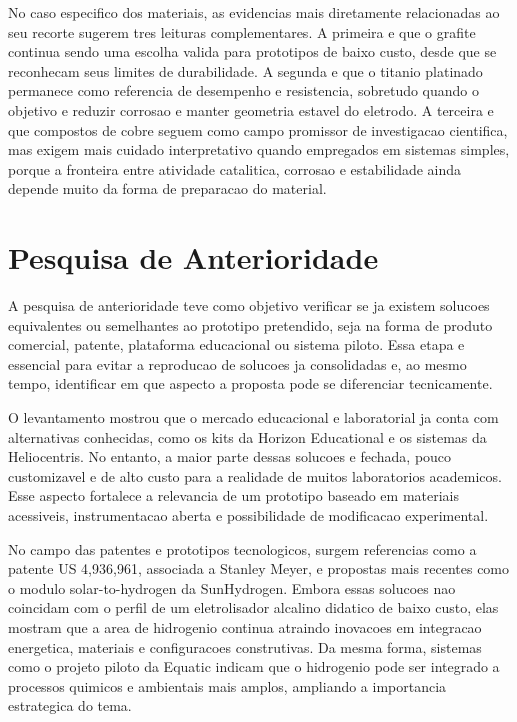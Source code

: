 \documentclass[12pt,oneside,a4paper,english,brazilian]{abntex2}
\begin{document}
No caso especifico dos materiais, as evidencias mais diretamente relacionadas ao seu recorte sugerem tres leituras complementares. A primeira e que o grafite continua sendo uma escolha valida para prototipos de baixo custo, desde que se reconhecam seus limites de durabilidade. A segunda e que o titanio platinado permanece como referencia de desempenho e resistencia, sobretudo quando o objetivo e reduzir corrosao e manter geometria estavel do eletrodo. A terceira e que compostos de cobre seguem como campo promissor de investigacao cientifica, mas exigem mais cuidado interpretativo quando empregados em sistemas simples, porque a fronteira entre atividade catalitica, corrosao e estabilidade ainda depende muito da forma de preparacao do material.

\section{Pesquisa de Anterioridade}

A pesquisa de anterioridade teve como objetivo verificar se ja existem solucoes equivalentes ou semelhantes ao prototipo pretendido, seja na forma de produto comercial, patente, plataforma educacional ou sistema piloto. Essa etapa e essencial para evitar a reproducao de solucoes ja consolidadas e, ao mesmo tempo, identificar em que aspecto a proposta pode se diferenciar tecnicamente.

O levantamento mostrou que o mercado educacional e laboratorial ja conta com alternativas conhecidas, como os kits da Horizon Educational e os sistemas da Heliocentris. No entanto, a maior parte dessas solucoes e fechada, pouco customizavel e de alto custo para a realidade de muitos laboratorios academicos. Esse aspecto fortalece a relevancia de um prototipo baseado em materiais acessiveis, instrumentacao aberta e possibilidade de modificacao experimental.

No campo das patentes e prototipos tecnologicos, surgem referencias como a patente US 4,936,961, associada a Stanley Meyer, e propostas mais recentes como o modulo solar-to-hydrogen da SunHydrogen. Embora essas solucoes nao coincidam com o perfil de um eletrolisador alcalino didatico de baixo custo, elas mostram que a area de hidrogenio continua atraindo inovacoes em integracao energetica, materiais e configuracoes construtivas. Da mesma forma, sistemas como o projeto piloto da Equatic indicam que o hidrogenio pode ser integrado a processos quimicos e ambientais mais amplos, ampliando a importancia estrategica do tema.
\end{document}
